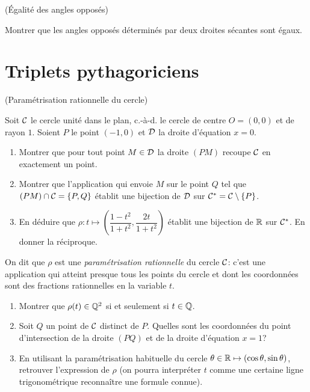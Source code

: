 \documentclass[a4paper,11pt,reqno]{amsart}
\begin{document}
\begin{exo} (Égalité des angles opposés)

  Montrer que les angles opposés déterminés par deux droites sécantes sont égaux.
\end{exo}


\section{Triplets pythagoriciens}

\begin{exo}\label{cerclerat} (Paramétrisation rationnelle du cercle)

  Soit $\mathcal{C}$ le cercle unité dans le plan, c.-à-d. le cercle de centre $O=(0,0)$ et de rayon $1$. Soient $P$ le point $(-1,0)$ et $\mathcal{D}$ la droite d'équation $x=0$.
  \begin{enumerate}
    \item Montrer que pour tout point $M \in \mathcal{D}$ la droite $(PM)$ recoupe $\mathcal{C}$ en exactement un point.
    \item Montrer que l'application qui envoie $M$ sur le point $Q$ tel que $(PM) \cap \mathcal{C} =\{P,Q\}$ établit une bijection de $\mathcal{D}$ sur $\mathcal{C}^\ast=\mathcal{C} \setminus \{P\}$.
    \item En déduire que $\rho \colon t \longmapsto \left( \dfrac{1-t^2}{1+t^2}, \dfrac{2t}{1+t^2}\right)$ établit une bijection de $\mathbb{R}$ sur $\mathcal{C}^\ast$. En donner la réciproque.
  \end{enumerate}
  \begin{convention}
      On dit que $\rho$ est une \emph{paramétrisation rationnelle} du cercle $\mathcal{C}$: c'est une application qui atteint presque tous les points du cercle et dont les coordonnées sont des fractions rationnelles en la variable $t$.
  \end{convention}
  \begin{enumerate}[resume]
    \item Montrer que $\rho(t) \in \mathbb{Q}^2$ si et seulement si $t \in \mathbb{Q}$.
    \item Soit $Q$ un point de $\mathcal{C}$ distinct de $P$. Quelles sont les coordonnées du point d'intersection de la droite $(PQ)$ et de la droite d'équation $x=1$?
    \item En utilisant la paramétrisation habituelle du cercle $\theta \in \mathbb{R} \mapsto (\cos \theta,\sin \theta)$, retrouver l'expression de $\rho$ (on pourra interpréter $t$ comme une certaine ligne trigonométrique reconnaître une formule connue).
  \end{enumerate}
\end{exo}
\end{document}
